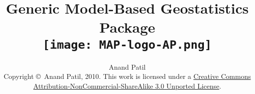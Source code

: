 \documentclass[a4paper]{report}
\begin{document}
\title{Generic Model-Based Geostatistics Package \\
\vspace{.5in}
\texttt{[image: MAP-logo-AP.png]}}
\author{Anand Patil\\ Copyright \copyright\  Anand Patil, 2010. This work is licensed under a \href{http://creativecommons.org/licenses/by-nc-sa/3.0/legalcode}{Creative Commons Attribution-NonCommercial-ShareAlike 3.0 Unported License}.}
\maketitle



\tableofcontents



 
 
 

%   
\end{document}

